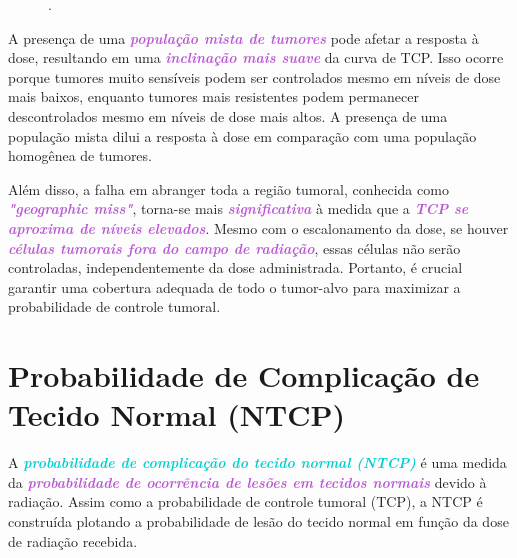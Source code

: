\documentclass[11pt,a4paper]{article}
\begin{document}
	\begin{figure}[h]
		\centering
		\caption{.}
		\label{fig:curvaTcpDiferentesResistencias}
	\end{figure}

	A presença de uma \textcolor{MediumOrchid}{\textbf{\textit{população mista de tumores}}} pode afetar a resposta à dose, resultando em uma \textcolor{MediumOrchid}{\textbf{\textit{inclinação mais suave}}} da curva de TCP. Isso ocorre porque tumores muito sensíveis podem ser controlados mesmo em níveis de dose mais baixos, enquanto tumores mais resistentes podem permanecer descontrolados mesmo em níveis de dose mais altos. A presença de uma população mista dilui a resposta à dose em comparação com uma população homogênea de tumores.

	Além disso, a falha em abranger toda a região tumoral, conhecida como \textcolor{MediumOrchid}{\textbf{\textit{"geographic miss"}}}, torna-se mais \textcolor{MediumOrchid}{\textbf{\textit{significativa}}} à medida que a \textcolor{MediumOrchid}{\textbf{\textit{TCP se aproxima de níveis elevados}}}. Mesmo com o escalonamento da dose, se houver \textcolor{MediumOrchid}{\textbf{\textit{células tumorais fora do campo de radiação}}}, essas células não serão controladas, independentemente da dose administrada. Portanto, é crucial garantir uma cobertura adequada de todo o tumor-alvo para maximizar a probabilidade de controle tumoral.

\section{Probabilidade de Complicação de Tecido Normal (NTCP)}

	A \textcolor{DarkTurquoise}{\textbf{\textit{probabilidade de complicação do tecido normal (NTCP)}}} é uma medida da \textcolor{MediumOrchid}{\textbf{\textit{probabilidade de ocorrência de lesões em tecidos normais}}} devido à radiação. Assim como a probabilidade de controle tumoral (TCP), a NTCP é construída plotando a probabilidade de lesão do tecido normal em função da dose de radiação recebida.
\end{document}
